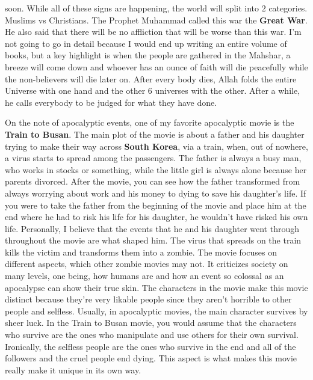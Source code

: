 \begin{essay}
  soon. While all of these signs are happening, the world will split into $2$
  categories. Muslims vs Christians. The Prophet Muhammad called this war the
  \textbf{Great War}. He also said that there will be no affliction that will be
  worse than this war. I'm not going to go in detail because I would end up
  writing an entire volume of books, but a key highlight is when the people are
  gathered in the Mahshar, a breeze will come down and whoever has an ounce of
  faith will die peacefully while the non-believers will die later on. After
  every body dies, Allah folds the entire Universe with one hand and the other
  $6$ universes with the other. After a while, he calls everybody to be judged
  for what they have done.

  On the note of apocalyptic events, one of my favorite apocalyptic movie is the
  \textbf{Train to Busan}. The main plot of the movie is about a father and his
  daughter trying to make their way across \textbf{South Korea}, via a train,
  when, out of nowhere, a virus starts to spread among the passengers. The
  father is always a busy man, who works in stocks or something, while the
  little girl is always alone because her parents divorced. After the movie, you
  can see how the father transformed from always worrying about work and his
  money to dying to save his daughter's life. If you were to take the father
  from the beginning of the movie and place him at the end where he had to risk
  his life for his daughter, he wouldn't have risked his own life. Personally, I
  believe that the events that he and his daughter went through throughout the
  movie are what shaped him. The virus that spreads on the train kills the
  victim and transforms them into a zombie. The movie focuses on different
  aspects, which other zombie movies may not. It criticizes society on many
  levels, one being, how humans are and how an event so colossal as an
  apocalypse can show their true skin. The characters in the movie make this
  movie distinct because they're very likable people since they aren't horrible
  to other people and selfless. Usually, in apocalyptic movies, the main
  character survives by sheer luck. In the Train to Busan movie, you would
  assume that the characters who survive are the ones who manipulate and use
  others for their own survival. Ironically, the selfless people are the ones
  who survive in the end and all of the followers and the cruel people end
  dying. This aspect is what makes this movie really make it unique in its own
  way.


\end{essay}

